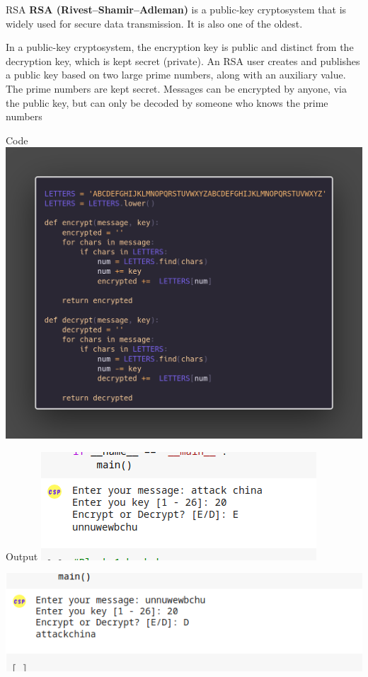 \documentclass{beamer}
\begin{document}
	\begin{frame}{RSA}
		\normalsize
		\textbf{RSA (Rivest–Shamir–Adleman)} is a public-key cryptosystem that is widely used for secure data transmission. It is also one of the oldest. 
		\par
		In a public-key cryptosystem, the encryption key is public and distinct from the decryption key, which is kept secret (private). An RSA user creates and publishes a public key based on two large prime numbers, along with an auxiliary value. The prime numbers are kept secret. Messages can be encrypted by anyone, via the public key, but can only be decoded by someone who knows the prime numbers
	\end{frame}

	\begin{frame}{Code}
		\includegraphics[scale=.17]{3pic.png}
	\end{frame}
	
	\begin{frame}{Output}
		\includegraphics[scale=1]{out2.png}
	\end{frame}
	\begin{frame}
		\includegraphics[scale=1]{out3.png}
	\end{frame}
	
\end{document}
